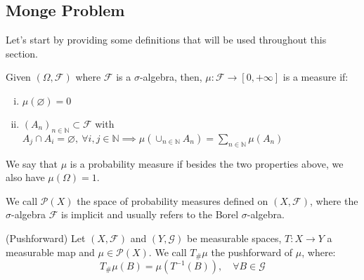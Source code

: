 \subsection{Monge Problem}

Let's start by providing some definitions that will be used throughout this section.
\begin{definition}
  Given $(\Omega,\mathcal F)$ where $\mathcal F$ is a $\sigma$-algebra,
  then, $\mu: \mathcal F \to [0,+\infty]$ is a measure if:
  \begin{enumerate}[i)]
    \item $\mu(\varnothing)=0$
    \item $(A_n)_{n\in \mathbb N} \subset \mathcal F$ with
          $A_j \cap A_i = \varnothing ,\ \forall i,j \in \mathbb N\implies
            \mu(\cup_{n \in \mathbb N}A_n) = \sum_{n \in \mathbb N}\mu(A_n)$
  \end{enumerate}
  We say that $\mu$ is a probability measure if besides the two
  properties above, we also have $\mu(\Omega) = 1$.
\end{definition}

\begin{definition}
  We call $\mathcal P(X)$ the space of probability measures defined
  on $(X,\mathcal F)$, where the $\sigma$-algebra $\mathcal F$
  is implicit and usually refers to the Borel $\sigma$-algebra.
\end{definition}

\begin{definition}(Pushforward)
  Let $(X,\mathcal F)$ and $(Y, \mathcal G)$ be measurable spaces, $T : X \to Y$ a measurable map
  and $\mu \in \mathcal P(X)$. We call $T_\# \mu$ the
  pushforward of $\mu$, where:
  \begin{equation}
    T_\#\mu(B) = \mu(T^{-1}(B)),\quad \forall B \in \mathcal G
  \end{equation}
\end{definition}


